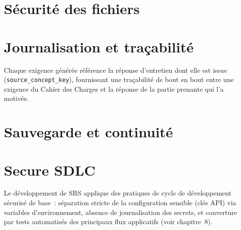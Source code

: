\section{Sécurité des fichiers}

\section{Journalisation et traçabilité}
Chaque exigence générée référence la réponse d'entretien dont elle est issue
(\texttt{source\_concept\_key}), fournissant une traçabilité de bout en bout entre une
exigence du Cahier des Charges et la réponse de la partie prenante qui l'a motivée.

\section{Sauvegarde et continuité}

\section{Secure SDLC}
Le développement de SRS applique des pratiques de cycle de développement sécurisé de
base~: séparation stricte de la configuration sensible (clés API) via variables
d'environnement, absence de journalisation des secrets, et couverture par tests
automatisés des principaux flux applicatifs (voir chapitre~8).

